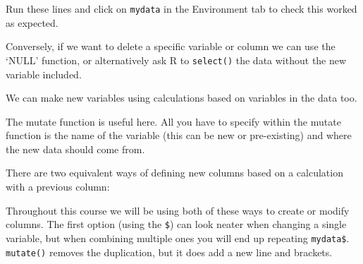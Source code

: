\documentclass[]{book}
\makeatletter
\newenvironment{Shaded}{\begin{snugshade}}{\end{snugshade}}
\newcommand{\KeywordTok}[1]{\textcolor[rgb]{0.13,0.29,0.53}{\textbf{#1}}}
\newcommand{\DataTypeTok}[1]{\textcolor[rgb]{0.13,0.29,0.53}{#1}}
\newcommand{\DecValTok}[1]{\textcolor[rgb]{0.00,0.00,0.81}{#1}}
\newcommand{\StringTok}[1]{\textcolor[rgb]{0.31,0.60,0.02}{#1}}
\newcommand{\CommentTok}[1]{\textcolor[rgb]{0.56,0.35,0.01}{\textit{#1}}}
\newcommand{\OtherTok}[1]{\textcolor[rgb]{0.56,0.35,0.01}{#1}}
\newcommand{\OperatorTok}[1]{\textcolor[rgb]{0.81,0.36,0.00}{\textbf{#1}}}
\newcommand{\NormalTok}[1]{#1}
\newenvironment{kframe}{%
\medskip{}
\setlength{\fboxsep}{.8em}
 \def\at@end@of@kframe{}%
 \ifinner\ifhmode%
  \def\at@end@of@kframe{\end{minipage}}%
  \begin{minipage}{\columnwidth}%
 \fi\fi%
 \def\FrameCommand##1{\hskip\@totalleftmargin \hskip-\fboxsep
 \colorbox{shadecolor}{##1}\hskip-\fboxsep
     \hskip-\linewidth \hskip-\@totalleftmargin \hskip\columnwidth}%
 \MakeFramed {\advance\hsize-\width
   \@totalleftmargin\z@ \linewidth\hsize
   \@setminipage}}%
 {\par\unskip\endMakeFramed%
 \at@end@of@kframe}
\renewenvironment{Shaded}{\begin{kframe}}{\end{kframe}}
\theoremstyle{definition}
\theoremstyle{definition}
\theoremstyle{definition}
\theoremstyle{remark}
\makeatother
\begin{document}
Run these lines and click on \texttt{mydata} in the Environment tab to
check this worked as expected.

Conversely, if we want to delete a specific variable or column we can
use the `NULL' function, or alternatively ask R to \texttt{select()} the
data without the new variable included.

\begin{Shaded}
\end{Shaded}

We can make new variables using calculations based on variables in the
data too.

The mutate function is useful here. All you have to specify within the
mutate function is the name of the variable (this can be new or
pre-existing) and where the new data should come from.

There are two equivalent ways of defining new columns based on a
calculation with a previous column:

\begin{Shaded}
\end{Shaded}

Throughout this course we will be using both of these ways to create or
modify columns. The first option (using the \texttt{\$}) can look neater
when changing a single variable, but when combining multiple ones you
will end up repeating \texttt{mydata\$}. \texttt{mutate()} removes the
duplication, but it does add a new line and brackets.
\end{document}
